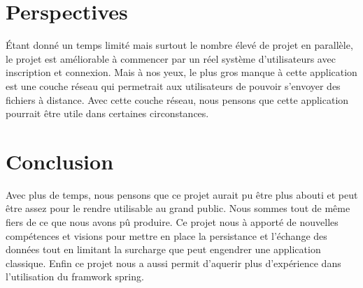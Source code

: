 \documentclass{article}
\begin{document}
\section{Perspectives}
Étant donné un temps limité mais surtout le nombre élevé de projet en parallèle, le projet est améliorable à commencer par un réel système d'utilisateurs avec inscription et connexion. Mais à nos yeux, le plus gros manque à cette application est une couche réseau qui permetrait aux utilisateurs de pouvoir s'envoyer des fichiers à distance. Avec cette couche réseau, nous pensons que cette application pourrait être utile dans certaines circonstances.

\section{Conclusion}
Avec plus de temps, nous pensons que ce projet aurait pu être plus abouti et peut être assez pour le rendre utilisable au grand public. Nous sommes tout de même fiers de ce que nous avons pû produire.
Ce projet nous à apporté de nouvelles compétences et visions pour mettre en place la persistance et l'échange des données tout en limitant la surcharge que peut engendrer une application classique. Enfin ce projet nous a aussi permit d'aquerir plus d'expérience dans l'utilisation du framwork spring.
\end{document}
